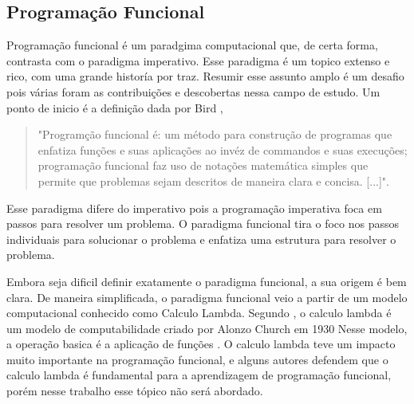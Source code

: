\subsection{Programação Funcional}


Programação funcional é um paradgima computacional que, de certa forma, contrasta com o paradigma imperativo.
Esse paradigma é um topico extenso e rico, com uma grande historía por traz.
Resumir esse assunto amplo é um desafio pois várias foram as contribuições e descobertas nessa campo de estudo.
Um ponto de inicio é a definição dada por Bird \cite{Bird},
\begin{quotation}
"Programção funcional é: um método para construção de programas que enfatiza funções e suas aplicações ao invéz de commandos e suas execuções; programação funcional faz uso de notações matemática simples que permite que problemas sejam descritos de maneira clara e concisa. [...]".
\end{quotation}
Esse paradigma difere do imperativo pois a programação imperativa foca em passos para resolver um problema.
O paradigma funcional tira o foco nos passos individuais para solucionar o problema e enfatiza uma estrutura para resolver o problema.

Embora seja dificil definir exatamente o paradigma funcional, a sua origem é bem clara.
De maneira simplificada, o paradigma funcional veio a partir de um modelo computacional conhecido como Calculo Lambda.
Segundo \cite{lambda}, o calculo lambda é um modelo de computabilidade criado por Alonzo Church em 1930
Nesse modelo, a operação basica é a aplicação de funções \cite{lambda}.
O calculo lambda teve um impacto muito importante na programação funcional, e alguns autores defendem que o calculo lambda é fundamental para a aprendizagem de programação funcional, porém nesse trabalho esse tópico não será abordado.

